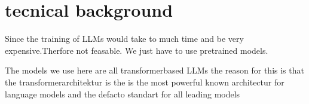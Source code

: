 





\pagebreak
\section{tecnical background}
Since the training of LLMs would take to much time and be very expensive.Therfore not feasable. We just have to use pretrained models.


The models we use here are all transformerbased LLMs the reason for this is that the transformerarchitektur is the is the most powerful known architectur for language models and the defacto standart for all leading models






